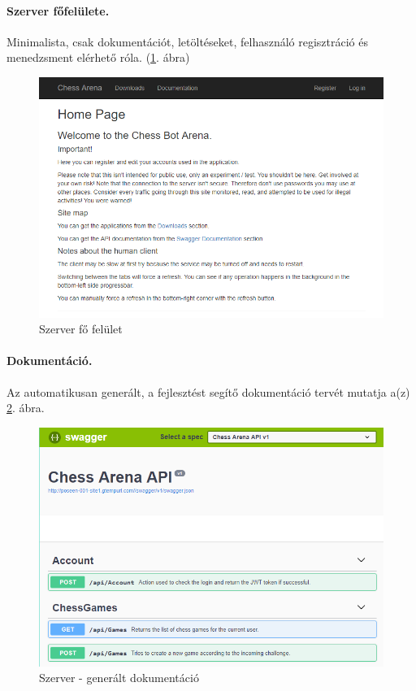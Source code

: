\documentclass[twoside, a4paper, 12pt]{article}
\begin{document}
\paragraph{Szerver főfelülete.} Minimalista, csak dokumentációt, letöltéseket, felhasználó regisztráció és menedzsment elérhető róla. (\ref{fig:serverUiMainScreen}. ábra)

\begin{figure}[htbp]
	\centering
	\includegraphics[width=1.0\textwidth]{img/serverUiMainScreen.png}
	\caption{Szerver fő felület}
	\label{fig:serverUiMainScreen}
\end{figure}

\paragraph{Dokumentáció.} Az automatikusan generált, a fejlesztést segítő dokumentáció tervét mutatja a(z) \ref{fig:serverUiDocumentation}. ábra.

\begin{figure}[htbp]
	\centering
	\includegraphics[width=1.0\textwidth]{img/serverUiDocumentation.png}
	\caption{Szerver - generált dokumentáció}
	\label{fig:serverUiDocumentation}
\end{figure}
\end{document}
